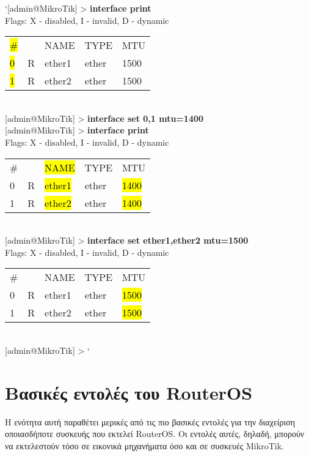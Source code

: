 \documentclass{EdipyLabs} %
\begin{document}
\begin{CommandBox}
`{[admin@MikroTik]} > \textbf{interface print}\\                                   
	Flags: X - disabled, I - invalid, D - dynamic\\
	\begin{tabular}{@{}llm{4.25cm}m{3.65cm}l}
  		\hl{\#} &   &NAME                 &TYPE             &MTU\\
		\hl{0}  &R &ether1               &ether            &1500\\
		\hl{1}  &R &ether2               &ether            &1500    
	\end{tabular}\\                               
	{[admin@MikroTik]} > \textbf{interface set 0,1 mtu=1400}\\
	{[admin@MikroTik]} > \textbf{interface print}\\                                   
		Flags: X - disabled, I - invalid, D - dynamic\\
	\begin{tabular}{@{}llm{4.25cm}m{3.65cm}l}
		\# &   &\hl{NAME}                 &TYPE             &MTU\\
		0  &R &\hl{ether1}               &ether            &\hl{1400}\\
		1  &R &\hl{ether2}               &ether            &\hl{1400}
	\end{tabular}\\ 
	{[admin@MikroTik]} > \textbf{interface set ether1,ether2 mtu=1500}\\
	Flags: X - disabled, I - invalid, D - dynamic\\
	\begin{tabular}{@{}llm{4.25cm}m{3.65cm}l}
	\# &   &NAME                 &TYPE             &MTU\\
	0  &R &ether1               &ether            &\hl{1500}\\
	1  &R &ether2               &ether            &\hl{1500}
	\end{tabular}\\  
	{[admin@MikroTik]} >  `                           
\end{CommandBox}

\section{Βασικές εντολές του RouterOS}
H ενότητα αυτή παραθέτει μερικές από τις πιο βασικές εντολές για την διαχείριση οποιασδήποτε συσκευής που εκτελεί RouterOS. Οι εντολές αυτές, δηλαδή, μπορούν να εκτελεστούν τόσο σε εικονικά μηχανήματα όσο και σε συσκευές MikroTik.
\end{document}
